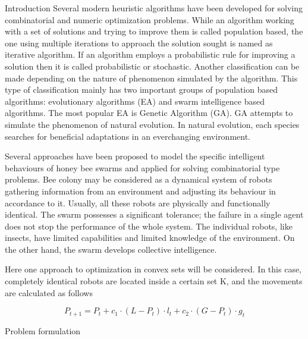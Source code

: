 \documentclass[final,hyperref]{beamer}
\begin{document}
\begin{frame}[t]
\begin{columns}[t]
\begin{column}{.465\textwidth}
\begin{block}{Introduction}
	\quad Several modern heuristic algorithms have been developed for solving combinatorial
	and numeric optimization problems. While an algorithm working with a set
	of solutions and trying to improve them is called population based, the one using
	multiple iterations to approach the solution sought is named as iterative algorithm.
	If an algorithm employs a probabilistic rule for improving a solution then it is called
	probabilistic or stochastic. Another classification can be made depending on the nature 
	of phenomenon simulated by the algorithm. This type of classification mainly has two
	important groups of population based algorithms: evolutionary algorithms (EA) and
	swarm intelligence based algorithms. The most popular EA is Genetic Algorithm
	(GA). GA attempts to simulate the phenomenon of natural evolution. In natural
	evolution, each species searches for beneficial adaptations in an everchanging 
	environment. 

	\quad Several approaches have been proposed to model the specific intelligent 
	behaviours of honey bee swarms and applied for solving combinatorial type problems.
	Bee colony may be considered as a dynamical system of robots gathering
	information from an environment and adjusting its behaviour in accordance to it. 	
	Usually, all these robots
	are physically and functionally identical. The swarm possesses a significant tolerance; 
	the failure in a single agent does not stop the performance of the whole system. 
	The individual robots, like insects, have limited capabilities and limited knowledge 
	of the environment. On the other hand, the swarm develops collective intelligence. 

	\quad Here one approach to optimization in convex sets will be considered.
	In this case, completely identical robots are located inside a certain set K, 
	and the movements are calculated as follows

	$$ P_{t+1} = P_t + c_1 \cdot (L - P_t) \cdot l_t + c_2 \cdot (G - P_t) \cdot g_t $$
	

\end{block}

            
\begin{block}{Problem formulation}


\end{block}
\end{column}
\end{columns}
\end{frame}
\end{document}
